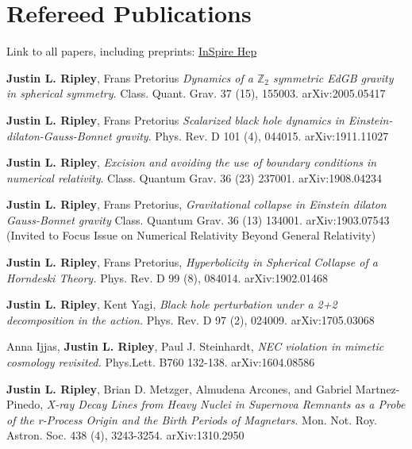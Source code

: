 \documentclass{my_cv}
\begin{document}
\section{Refereed Publications}
Link to all papers, including
preprints: \href{https://inspirehep.net/authors/1477964}{InSpire Hep}
\begin{etaremune}
\item {\bf Justin L. Ripley}, Frans Pretorius 
	\emph{Dynamics of a $\mathbb{Z}_2$ symmetric EdGB gravity in
	spherical symmetry}.
	Class. Quant. Grav. 37 (15), 155003.
	arXiv:2005.05417
\item {\bf Justin L. Ripley}, Frans Pretorius 
	\emph{Scalarized black hole dynamics in
	Einstein-dilaton-Gauss-Bonnet gravity}.
	Phys. Rev. D 101 (4), 044015.
	arXiv:1911.11027
\item {\bf Justin L. Ripley}, 
	\emph{Excision and avoiding the use of boundary conditions
	in numerical relativity}.
	Class. Quantum Grav. 36 (23) 237001.  
	arXiv:1908.04234
\item {\bf Justin L. Ripley}, Frans Pretorius, 
	\emph{Gravitational collapse in Einstein
	dilaton Gauss-Bonnet gravity}
	Class. Quantum Grav. 36 (13) 134001. arXiv:1903.07543
	(Invited to Focus Issue on Numerical
	Relativity Beyond General Relativity)
\item {\bf Justin L. Ripley}, Frans Pretorius, 
	\emph{Hyperbolicity in Spherical Collapse of a Horndeski Theory.}
	Phys. Rev. D 99 (8), 084014. arXiv:1902.01468
\item {\bf Justin L. Ripley}, Kent Yagi, 
	\emph{Black hole perturbation under a 2+2 decomposition
	in the action.}
	Phys. Rev. D 97 (2), 024009. arXiv:1705.03068
\item Anna Ijjas, {\bf Justin L. Ripley}, Paul J. Steinhardt,
	\emph{NEC violation in mimetic cosmology revisited.}
	Phys.Lett. B760 132-138. arXiv:1604.08586
\item {\bf Justin L. Ripley}, Brian D. Metzger,	
	Almudena Arcones, and Gabriel Martnez-Pinedo,
	\emph{X-ray Decay Lines from Heavy Nuclei in
	Supernova Remnants as a Probe of the r-Process Origin
	and the Birth Periods of Magnetars.}
	Mon. Not. Roy. Astron. Soc. 438 (4), 3243-3254.
	arXiv:1310.2950
\end{etaremune}
\end{document}
